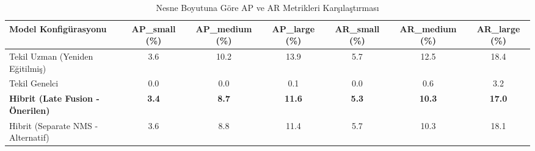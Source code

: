 \begin{table}[htbp]
\caption{Nesne Boyutuna Göre AP ve AR Metrikleri Karşılaştırması}
\label{tab:object_size}
\centering
\begin{tabular}{lcccccc}
\hline
\textbf{Model Konfigürasyonu} & \textbf{AP\_small (\%)} & \textbf{AP\_medium (\%)} & \textbf{AP\_large (\%)} & \textbf{AR\_small (\%)} & \textbf{AR\_medium (\%)} & \textbf{AR\_large (\%)} \\ \hline
Tekil Uzman (Yeniden Eğitilmiş) & 3.6 & 10.2 & 13.9 & 5.7 & 12.5 & 18.4 \\
Tekil Genelci & 0.0 & 0.0 & 0.1 & 0.0 & 0.6 & 3.2 \\
\textbf{Hibrit (Late Fusion - Önerilen)} & \textbf{3.4} & \textbf{8.7} & \textbf{11.6} & \textbf{5.3} & \textbf{10.3} & \textbf{17.0} \\
Hibrit (Separate NMS - Alternatif) & 3.6 & 8.8 & 11.4 & 5.7 & 10.3 & 18.1 \\
\hline
\end{tabular}
\end{table}
